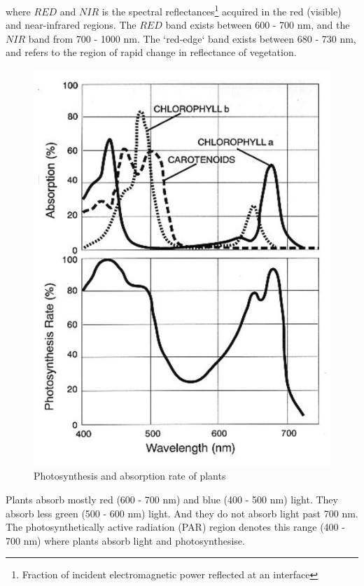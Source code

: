 where $RED$ and $NIR$ is the spectral reflectances\footnote{Fraction of incident electromagnetic power reflected at an interface} acquired in the red (visible) and near-infrared regions. The $RED$ band exists between 600 - 700 nm, and the $NIR$ band from 700 - 1000 nm. The `red-edge` band exists between 680 - 730 nm, and refers to the region of rapid change in reflectance of vegetation.

\begin{figure}[H]
\centering
\includegraphics[scale=0.5]{images/chlorophyll.jpg}
\centering
\caption{Photosynthesis and absorption rate of plants \cite{ndvi_wiki}}
\label{fig:chlorophyll}
\end{figure}

Plants absorb mostly red (600 - 700 nm) and blue (400 - 500 nm) light. They absorb less green (500 - 600 nm) light. And they do not absorb light past 700 nm. The photosynthetically active radiation (PAR) region denotes this range (400 - 700 nm) where plants absorb light and photosynthesise.

